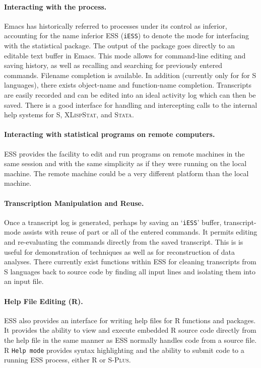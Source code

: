 \documentclass{article}
\newcommand*{\Splus}{\textsc{S-Plus}}
\newcommand*{\XLispStat}{\textsc{XLispStat}}
\newcommand*{\Stata}{\textsc{Stata}}
\newcommand{\stexttt}[1]{{\small\texttt{#1}}}
\newcommand{\file}[1]{`\stexttt{#1}'}
\begin{document}
\paragraph{Interacting with the process.}
Emacs has historically referred to processes under its control as
inferior, accounting for the name inferior ESS (\stexttt{iESS}) to
denote the mode for interfacing with the statistical package.  
The output of the package goes directly to an editable text buffer in Emacs.
This
mode allows for command-line editing and saving history, as well as
recalling and searching for previously entered commands.
Filename completion is available.    In addition (currently only for for S
languages), there exists object-name and function-name completion.
Transcripts are easily recorded and can be edited into an ideal
activity log which can then be saved.  There is a good interface for
handling and intercepting calls to the internal help systems for S,
\XLispStat, and \Stata.

\paragraph{Interacting with statistical programs on remote computers.}
ESS provides the facility to edit and run programs on remote machines
in the same session and with the same simplicity as if they were
running on the local machine.  The remote machine could be a very
different platform than the local machine.

\paragraph{Transcription Manipulation and Reuse.}
Once a transcript log is generated, perhaps by saving an
\file{iESS} buffer, transcript-mode assists with reuse of part or
all of the entered commands.  It permits editing and re-evaluating the
commands directly from the saved transcript.  This is is useful for
demonstration of techniques as well as for reconstruction of data
analyses.  There currently exist functions within ESS for cleaning
transcripts from S languages back to source code by finding all input
lines and isolating them into an input file.

\paragraph{Help File Editing (R).}
ESS also provides an interface for writing help files for R functions
and packages.  It provides the ability to view and execute embedded R
source code directly from the help file in the same manner as ESS
normally handles code from a source file.  R \stexttt{Help mode} provides syntax
highlighting and the ability to submit code to a running ESS
process, either R or \Splus.
\end{document}
